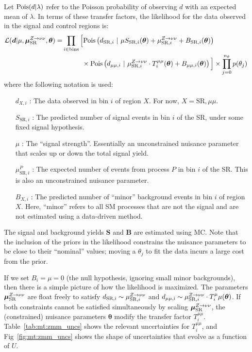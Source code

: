 Let $\mathrm{Pois}(d|\lambda)$ refer to the Poisson probability of observing $d$ with an expected mean of $\lambda$. 
In terms of these transfer factors, the likelihood for the data observed in the signal and control regions is:
\begin{align}
    \mathcal{L}(\bm{d} | \mu, \bm{\mu}^{Z\rightarrow\nu\nu}_\mathrm{SR},  \bm{\theta}) = & \prod_{i\in\mathrm{bins}} \Big[ 
         \pois\left(d_{\mathrm{SR},i} ~|~ \mu S_{\mathrm{SR},i}(\bm\theta)  + \mu_{\mathrm{SR},i}^{Z\rightarrow\nu\nu} + B_{\mathrm{SR},i}(\bm\theta)\right) \nonumber \\
         & \phantom{\prod_{i\in\mathrm{bins}}\Big[} \times \pois\left(d_{\mu\mu,i}~|~ \mu_{\mathrm{SR},i}^{Z\rightarrow\nu\nu} \cdot T_i^{\mu\mu}(\bm\theta) + B_{\mu\mu,i}(\bm\theta) \right)\Big]  \times  \prod_{j=0}^{n_\theta} p(\theta_j)
\end{align}
where the following notation is used:
\begin{itemize}
    \item[$d_{X,i}$]: The data observed in bin $i$ of region $X$. For now, $X=\mathrm{SR},\mu\mu$. 
    \item[$S_{\mathrm{SR},i}$]: The predicted number of signal events in bin $i$ of the SR, under some fixed signal hypothesis. 
    \item[$\mu$]: The ``signal strength''. Essentially an unconstrained nuisance parameter that scales up or down the total signal yield. 
    \item[$\mu_{\mathrm{SR},i}^P$]: The expected number of events from process $P$ in bin $i$ of the SR. This is also an unconstrained nuisance parameter. 
    \item[$B_{X,i}$]: The predicted number of ``minor'' background events in bin $i$ of region $X$. Here, ``minor'' refers to all SM processes that are not the signal and are not estimated using a data-driven method. 
\end{itemize}
The signal and background yields $\bm{S}$ and $\bm{B}$ are estimated using MC.
Note that the inclusion of the priors in the likelihood constrains the nuisance parameters to be close to their ``nominal'' values; moving a $\theta_j$ to fit the data incurs a large cost from the prior.

If we set $B_i = \mu = 0$ (the null hypothesis, ignoring small minor backgrounds), then there is a simple picture of how the likelihood is maximized.
The parameters $\bm{\mu}_{\mathrm{SR}}^{Z\rightarrow\nu\nu}$ are float freely to satisfy $d_\mathrm{SR,i} \sim \mu_{\mathrm{SR},i}^{Z\rightarrow\nu\nu}$ and $d_\mathrm{\mu\mu,i}\sim \mu_{\mathrm{SR},i}^{Z\rightarrow\nu\nu} \cdot T_i^\mu\mu(\bm\theta)$. 
If both constraints cannot be satisfied simultaneously by scaling $\bm{\mu}_{\mathrm{SR}}^{Z\rightarrow\nu\nu}$, the (constrained) nuisance parameters $\bm\theta$ modify the transfer factor $T_i^{\mu\mu}$. 
Table~\ref{tab:mt:zmm_uncs} shows the relevant uncertainties for $T_i^{\mu\mu}$, and Fig~\ref{fig:mt:zmm_uncs} shows the shape of uncertainties that evolve as a function of $U$.


